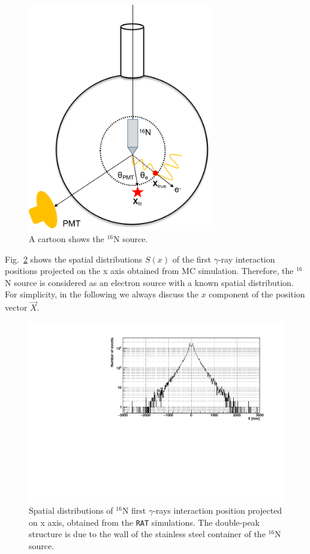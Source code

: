 \begin{figure}[!htb]
	\centering
	\includegraphics[width=8cm]{N16centralDiagram.png}
	\caption{A cartoon shows the $^{16}$N source.}
	\label{N16centralDiagram}
\end{figure}

Fig.~\ref{hsx} shows the spatial distributions $S(x)$ of the first $\gamma$-ray interaction positions projected on the x axis obtained from MC simulation. Therefore, the $^{16}$N source is considered as an electron source with a known spatial distribution\cite{boulay2004direct}. For simplicity, in the following we always discuss the $x$ component of the position vector $\vec{X}$. 

\begin{figure}[!htb]
	\centering
	\includegraphics[width=12cm]{sx.pdf}
	\caption{Spatial distributions of {$^{16}$}N first $\gamma$-rays interaction position projected on x axis, obtained from the \texttt{RAT} simulations. The double-peak structure is due to the wall of the stainless steel container of the $^{16}$N source.}
	\label{hsx}
\end{figure}

